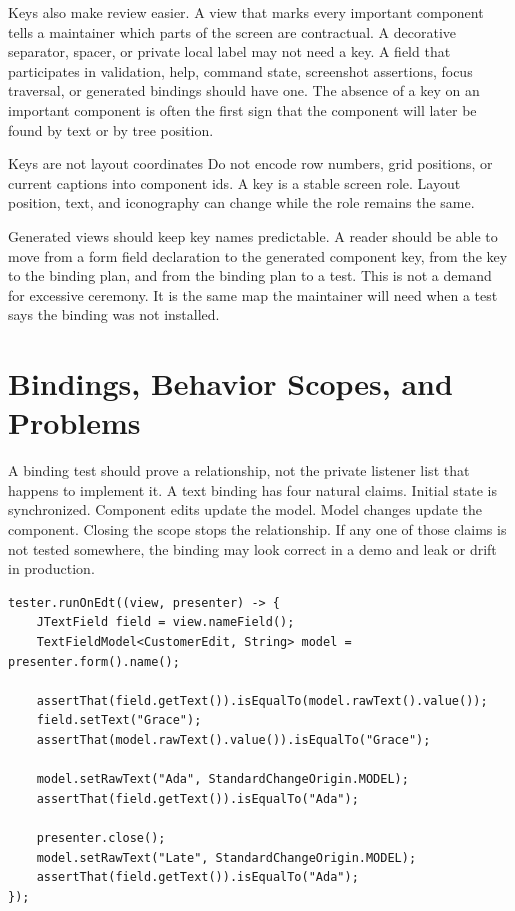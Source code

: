Keys also make review easier. A view that marks every important component tells a maintainer which parts of the screen are contractual. A decorative separator, spacer, or private local label may not need a key. A field that participates in validation, help, command state, screenshot assertions, focus traversal, or generated bindings should have one. The absence of a key on an important component is often the first sign that the component will later be found by text or by tree position.

\begin{pitfallbox}{Keys are not layout coordinates}
Do not encode row numbers, grid positions, or current captions into component ids. A key is a stable screen role. Layout position, text, and iconography can change while the role remains the same.
\end{pitfallbox}

Generated views should keep key names predictable. A reader should be able to move from a form field declaration to the generated component key, from the key to the binding plan, and from the binding plan to a test. This is not a demand for excessive ceremony. It is the same map the maintainer will need when a test says the  binding was not installed.

\section{Bindings, Behavior Scopes, and Problems}

A binding test should prove a relationship, not the private listener list that happens to implement it. A text binding has four natural claims. Initial state is synchronized. Component edits update the model. Model changes update the component. Closing the scope stops the relationship. If any one of those claims is not tested somewhere, the binding may look correct in a demo and leak or drift in production.

\begin{lstlisting}[caption={The useful shape of a text binding test.}]
tester.runOnEdt((view, presenter) -> {
    JTextField field = view.nameField();
    TextFieldModel<CustomerEdit, String> model = presenter.form().name();

    assertThat(field.getText()).isEqualTo(model.rawText().value());
    field.setText("Grace");
    assertThat(model.rawText().value()).isEqualTo("Grace");

    model.setRawText("Ada", StandardChangeOrigin.MODEL);
    assertThat(field.getText()).isEqualTo("Ada");

    presenter.close();
    model.setRawText("Late", StandardChangeOrigin.MODEL);
    assertThat(field.getText()).isEqualTo("Ada");
});
\end{lstlisting}


